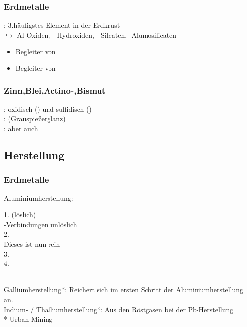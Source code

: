 \documentclass{article}
\begin{document}
\subsubsection{Erdmetalle}
: 3.häufigstes Element in der Erdkrust\\
$\hookrightarrow$ Al-Oxiden, - Hydroxiden, - Silcaten, -Alumosilicaten\\
\begin{itemize}
    \item {} Begleiter von 
    \item {} Begleiter von 
\end{itemize}

\subsubsection{Zinn,Blei,Actino-,Bismut}
: oxidisch () und sulfidisch ()\\
:  (Grauspießerglanz)\\
:  aber auch 

\subsection{Herstellung}
\subsubsection{Erdmetalle}
Aluminiumherstellung: 
\begin{center}
    1.  (löslich)\\
    -Verbindungen unlöslich\\
   2. \\
    Dieses  ist nun rein\\
   3. \\
   4. \\
    \\
\end{center}
Galliumherstellung*: Reichert sich im ersten Schritt der Aluminiumherstellung an.\\
Indium- / Thalliumherstellung*: Aus den Röstgasen bei der Pb-Herstellung\\
* Urban-Mining
\end{document}
